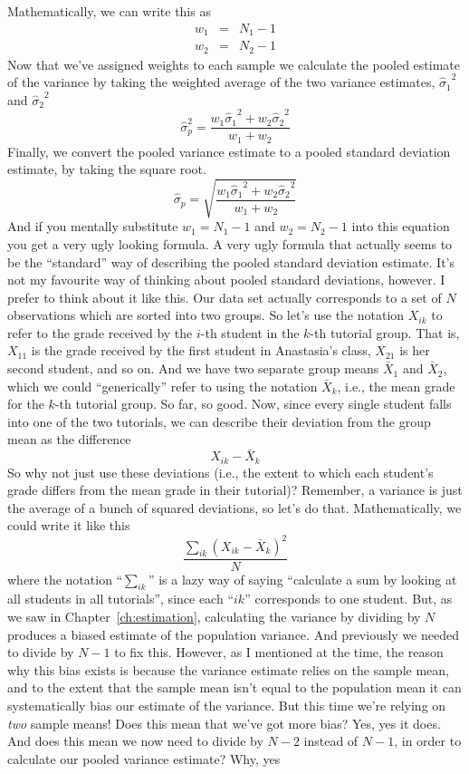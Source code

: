 \vspace{0.7cm}
\begin{mdframed}[style=MyFrame,nobreak=false]
Mathematically, we can write this as
$$
\begin{array}{rcl}
w_1 &=& N_1 - 1\\
w_2 &=& N_2 - 1
\end{array}
$$
Now that we've assigned weights to each sample we calculate the pooled estimate of the variance by taking the weighted average of the two variance estimates, ${\hat\sigma_1}^2$ and ${\hat\sigma_2}^2$ 
$$
\hat\sigma^2_p = \frac{w_1 {\hat\sigma_1}^2 + w_2 {\hat\sigma_2}^2}{w_1 + w_2}
$$
Finally, we convert the pooled variance estimate to a pooled standard deviation estimate, by taking the square root. 
$$
\hat\sigma_p = \sqrt{\frac{w_1 {\hat\sigma_1}^2 + w_2 {\hat\sigma_2}^2}{w_1 + w_2}}
$$
And if you mentally substitute $w_1 = N_1 -1$ and $w_2 = N_2 -1$ into this equation you get a very ugly looking formula. A very ugly formula that actually seems to be the ``standard'' way of describing the pooled standard deviation estimate. It's not my favourite way of thinking about pooled standard deviations, however. I prefer to think about it like this. Our data set actually corresponds to a set of $N$ observations which are sorted into two groups. So let's use the notation $X_{ik}$ to refer to the grade received by the $i$-th student in the $k$-th tutorial group. That is, $X_{11}$ is the grade received by the first student in Anastasia's class, $X_{21}$ is her second student, and so on. And we have two separate group means $\bar{X}_1$ and $\bar{X}_2$, which we could ``generically'' refer to using the notation $\bar{X}_k$, i.e., the mean grade for the $k$-th tutorial group. So far, so good. Now, since every single student falls into one of the two tutorials, we can describe their deviation from the group mean as the difference
$$
X_{ik} - \bar{X}_k
$$
So why not just use these deviations (i.e., the extent to which each student's grade differs from the mean grade in their tutorial)? Remember, a variance is just the average of a bunch of squared deviations, so let's do that. Mathematically, we could write it like this
$$
\frac{\sum_{ik} \left( X_{ik} - \bar{X}_k \right)^2}{N}
$$
where the notation ``$\sum_{ik}$'' is a lazy way of saying ``calculate a sum by looking at all students in all tutorials'', since each ``$ik$'' corresponds to one student. But, as we saw in Chapter~\ref{ch:estimation}, calculating the variance by dividing by $N$ produces a biased estimate of the population variance. And previously we needed to divide by $N-1$ to fix this. However, as I mentioned at the time, the reason why this bias exists is because the variance estimate relies on the sample mean, and to the extent that the sample mean isn't equal to the population mean it can systematically bias our estimate of the variance. But this time we're relying on {\it two} sample means! Does this mean that we've got more bias? Yes, yes it does. And does this mean we now need to divide by $N-2$ instead of $N-1$, in order to calculate our pooled variance estimate? Why, yes

\end{mdframed}

